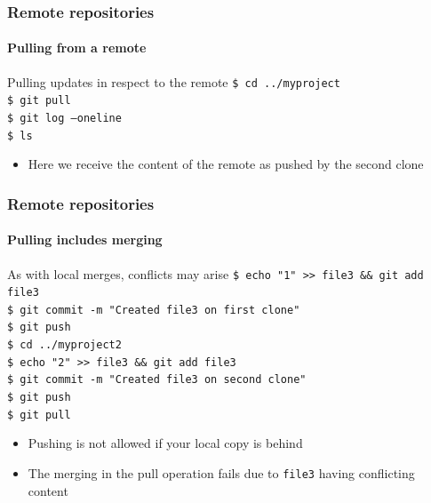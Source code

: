 \begin{frame}
\frametitle{Remote repositories}
\framesubtitle{Pulling from a remote}

\begin{block}{Pulling updates in respect to the remote}
\texttt{\$ cd ../myproject} \\
\texttt{\$ git pull} \\
\texttt{\$ git log ---oneline} \\
\texttt{\$ ls}

\begin{itemize}
\item Here we receive the content of the remote as pushed by the second clone
\end{itemize}
\end{block}

\end{frame}

\begin{frame}
\frametitle{Remote repositories}
\framesubtitle{Pulling includes merging}

\begin{block}{As with local merges, conflicts may arise}
\texttt{\$ echo "1" >\;\!\!> file3 \&\& git add file3} \\
\texttt{\$ git commit -m "Created file3 on first clone"} \\
\texttt{\$ git push} \\
\texttt{\$ cd ../myproject2} \\
\texttt{\$ echo "2" >\;\!\!> file3 \&\& git add file3} \\
\texttt{\$ git commit -m "Created file3 on second clone"} \\
\texttt{\$ git push} \\
\texttt{\$ git pull}

\begin{itemize}
\item Pushing is not allowed if your local copy is behind
\item The merging in the pull operation fails due to \texttt{file3} having conflicting content
\end{itemize}
\end{block}

\end{frame}

